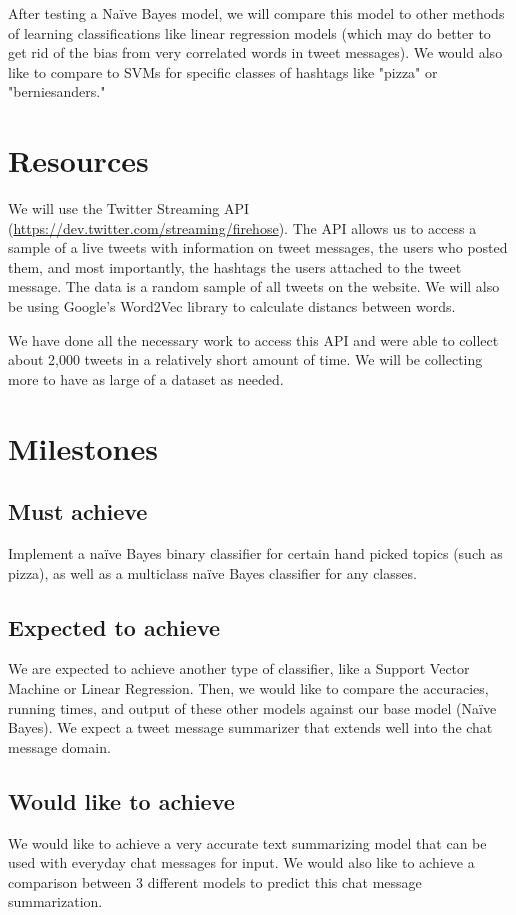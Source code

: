\documentclass[11pt]{article}
\begin{document}
After testing a Na{\"i}ve Bayes model, we will compare this model to other methods of learning classifications like linear regression models (which may do better to get rid of the bias from very correlated words in tweet messages). We would also like to compare to SVMs for specific classes of hashtags like "pizza" or "berniesanders."

\section{Resources}
We will use the Twitter Streaming API (\url{https://dev.twitter.com/streaming/firehose}). The API allows us to access a sample of a live tweets with information on tweet messages, the users who posted them, and most importantly, the hashtags the users attached to the tweet message. The data is a random sample of all tweets on the website. We will also be using Google's Word2Vec library to calculate distancs between words.

We have done all the necessary work to access this API and were able to collect about 2,000 tweets in a relatively short amount of time. We will be collecting more to have as large of a dataset as needed.

\section{Milestones}
\subsection{Must achieve}
Implement a na{\"i}ve Bayes binary classifier for certain hand picked topics (such as pizza), as well as a multiclass na{\"i}ve Bayes classifier for any classes.

\subsection{Expected to achieve}
We are expected to achieve another type of classifier, like a Support Vector Machine or Linear Regression. Then, we would like to compare the accuracies, running times, and output of these other models against our base model (Na{\"i}ve Bayes). We expect a tweet message summarizer that extends well into the chat message domain.

\subsection{Would like to achieve}
We would like to achieve a very accurate text summarizing model that can be used with everyday chat messages for input. We would also like to achieve a comparison between 3 different models to predict this chat message summarization.
\end{document}
